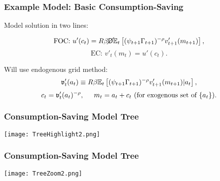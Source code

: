 \documentclass[11ptt]{beamer}
\begin{document}
\begin{frame}
  \frametitle{Example Model: Basic Consumption-Saving}

  Model solution in two lines:

  \begin{equation*}
    \text{FOC: } u'(c_t) = R \beta \cancel{\mathsf{D}} \mathbb{E}_t \left[(\psi_{t+1} \Gamma_{t+1})^{-\rho} v'_{t+1}(m_{t+1}) \right],
  \end{equation*}
  \begin{equation*}
    \text{EC: } v'_t(m_t) = u'(c_t).
  \end{equation*}

  Will use endogenous grid method:
  \begin{equation*}
    \mathfrak{v}'_t(a_t) \equiv R \beta \mathbb{E}_t \left[(\psi_{t+1} \Gamma_{t+1})^{-\rho} v'_{t+1}(m_{t+1}) | a_t\right],
  \end{equation*}
  \begin{equation*}
    c_t = \mathfrak{v}'_t(a_t)^{-\rho}, \hspace{0.5cm} m_t = a_t + c_t \text{ (for exogenous set of } \{a_t\} \text{)}.
  \end{equation*}

  \hyperlink{ModelStatement}{}
\end{frame}





\begin{frame}\label{Recombination}
  \frametitle{Consumption-Saving Model Tree}
  \begin{center}
    \texttt{[image: TreeHighlight2.png]}
  \end{center}
\end{frame}

\begin{frame}
  \frametitle{Consumption-Saving Model Tree}
  \begin{center}
    \texttt{[image: TreeZoom2.png]}
  \end{center}
\end{frame}
\end{document}
